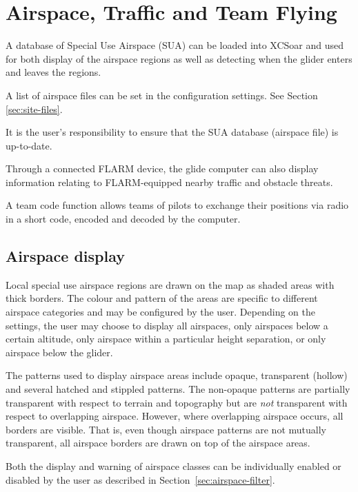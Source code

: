 
\chapter{Airspace, Traffic and Team Flying}\label{cha:airspace}
A database of Special Use Airspace (SUA) can be loaded into XCSoar and
used for both display of the airspace regions as well as detecting
when the glider enters and leaves the regions.

A list of airspace files can be set in the configuration settings. 
See Section \ref{sec:site-files}.

It is the user's responsibility to ensure that the SUA database
(air\-space file) is up-to-date.

Through a connected FLARM device, the glide computer can also
display information relating to FLARM-equipped nearby traffic
and obstacle threats.

A team code function allows teams of pilots to exchange their
positions via radio in a short code, encoded and decoded by the
computer.


\section{Airspace display}

Local special use airspace regions are drawn on the map as shaded
areas with thick borders.  The colour and pattern of the areas are
specific to different airspace categories and may be configured by the
user.  Depending on the settings, the user may choose to display all
airspaces, only airspaces below a certain altitude, only airspace within a
particular height separation, or only airspace below the glider.

The patterns used to display airspace areas include opaque,
transparent (hollow) and several hatched and stippled patterns.  The
non-opaque patterns are partially transparent with respect to terrain
and topography but are \emph{not} transparent with respect to overlapping
airspace.  However, where overlapping airspace occurs, all borders are
visible.  That is, even though airspace patterns are not mutually
transparent, all airspace borders are drawn on top of the airspace
areas.

Both the display and warning of airspace classes can be individually
enabled or disabled by the user as described in
Section~\ref{sec:airspace-filter}.

